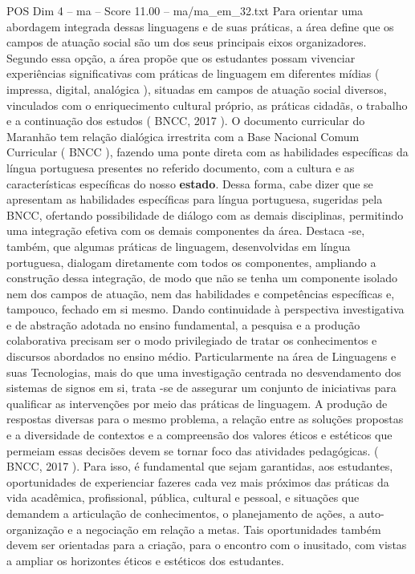 \begin{textsample}{POS Dim 4 – ma – Score 11.00 – ma/ma\_em\_32.txt}
Para orientar uma abordagem integrada dessas linguagens e de suas práticas, a área define que os campos de atuação social são um dos seus principais eixos organizadores.
Segundo essa opção, a área propõe que os estudantes possam vivenciar experiências significativas com práticas de linguagem em diferentes mídias ( impressa, digital, analógica ), situadas em campos de atuação social diversos, vinculados com o enriquecimento cultural próprio, as práticas cidadãs, o trabalho e a continuação dos estudos ( BNCC, 2017 ).
O documento curricular do Maranhão tem relação dialógica irrestrita com a Base Nacional Comum Curricular ( BNCC ), fazendo uma ponte direta com as habilidades específicas da língua portuguesa presentes no referido documento, com a cultura e as características específicas do nosso \textbf{estado}.
Dessa forma, cabe dizer que se apresentam as habilidades específicas para língua portuguesa, sugeridas pela BNCC, ofertando possibilidade de diálogo com as demais disciplinas, permitindo uma integração efetiva com os demais componentes da área.
Destaca -se, também, que algumas práticas de linguagem, desenvolvidas em língua portuguesa, dialogam diretamente com todos os componentes, ampliando a construção dessa integração, de modo que não se tenha um componente isolado nem dos campos de atuação, nem das habilidades e competências específicas e, tampouco, fechado em si mesmo.
Dando continuidade à perspectiva investigativa e de abstração adotada no ensino fundamental, a pesquisa e a produção colaborativa precisam ser o modo privilegiado de tratar os conhecimentos e discursos abordados no ensino médio.
Particularmente na área de Linguagens e suas Tecnologias, mais do que uma investigação centrada no desvendamento dos sistemas de signos em si, trata -se de assegurar um conjunto de iniciativas para qualificar as intervenções por meio das práticas de linguagem.
A produção de respostas diversas para o mesmo problema, a relação entre as soluções propostas e a diversidade de contextos e a compreensão dos valores éticos e estéticos que permeiam essas decisões devem se tornar foco das atividades pedagógicas. ( BNCC, 2017 ).
Para isso, é fundamental que sejam garantidas, aos estudantes, oportunidades de experienciar fazeres cada vez mais próximos das práticas da vida acadêmica, profissional, pública, cultural e pessoal, e situações que demandem a articulação de conhecimentos, o planejamento de ações, a auto-organização e a negociação em relação a metas.
Tais oportunidades também devem ser orientadas para a criação, para o encontro com o inusitado, com vistas a ampliar os horizontes éticos e estéticos dos estudantes.

\end{textsample}
